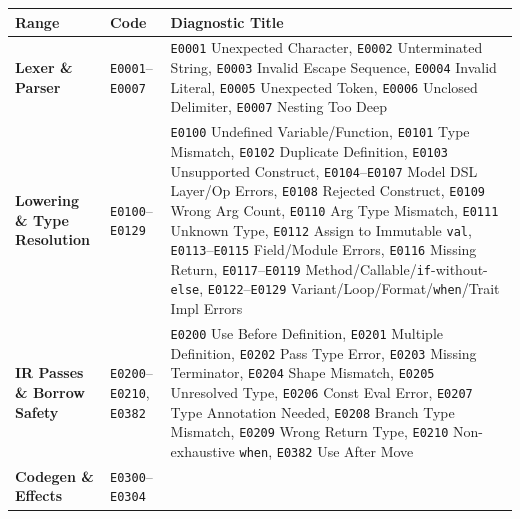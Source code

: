 \documentclass[
  english,
  oneside]{book}
\newcounter{none} %
\begin{document}
{\def\LTcaptype{none} %
\begin{longtable}[]{@{}
  >{\raggedright\arraybackslash}p{}
  >{\raggedright\arraybackslash}p{}
  >{\raggedright\arraybackslash}p{}@{}}
\toprule\noalign{}
\begin{minipage}[b]{\linewidth}\raggedright
Range
\end{minipage} & \begin{minipage}[b]{\linewidth}\raggedright
Code
\end{minipage} & \begin{minipage}[b]{\linewidth}\raggedright
Diagnostic Title
\end{minipage} \\
\midrule\noalign{}
\endhead
\bottomrule\noalign{}
\endlastfoot
\textbf{Lexer \& Parser} & \texttt{E0001}--\texttt{E0007} &
\texttt{E0001} Unexpected Character, \texttt{E0002} Unterminated String,
\texttt{E0003} Invalid Escape Sequence, \texttt{E0004} Invalid Literal,
\texttt{E0005} Unexpected Token, \texttt{E0006} Unclosed Delimiter,
\texttt{E0007} Nesting Too Deep \\
\textbf{Lowering \& Type Resolution} & \texttt{E0100}--\texttt{E0129} &
\texttt{E0100} Undefined Variable/Function, \texttt{E0101} Type
Mismatch, \texttt{E0102} Duplicate Definition, \texttt{E0103}
Unsupported Construct, \texttt{E0104}--\texttt{E0107} Model DSL Layer/Op
Errors, \texttt{E0108} Rejected Construct, \texttt{E0109} Wrong Arg
Count, \texttt{E0110} Arg Type Mismatch, \texttt{E0111} Unknown Type,
\texttt{E0112} Assign to Immutable \texttt{val},
\texttt{E0113}--\texttt{E0115} Field/Module Errors, \texttt{E0116}
Missing Return, \texttt{E0117}--\texttt{E0119}
Method/Callable/\texttt{if}-without-\texttt{else},
\texttt{E0122}--\texttt{E0129} Variant/Loop/Format/\texttt{when}/Trait
Impl Errors \\
\textbf{IR Passes \& Borrow Safety} & \texttt{E0200}--\texttt{E0210},
\texttt{E0382} & \texttt{E0200} Use Before Definition, \texttt{E0201}
Multiple Definition, \texttt{E0202} Pass Type Error, \texttt{E0203}
Missing Terminator, \texttt{E0204} Shape Mismatch, \texttt{E0205}
Unresolved Type, \texttt{E0206} Const Eval Error, \texttt{E0207} Type
Annotation Needed, \texttt{E0208} Branch Type Mismatch, \texttt{E0209}
Wrong Return Type, \texttt{E0210} Non-exhaustive \texttt{when},
\texttt{E0382} Use After Move \\
\textbf{Codegen \& Effects} & \texttt{E0300}--\texttt{E0304} &

\end{longtable}}
\end{document}
